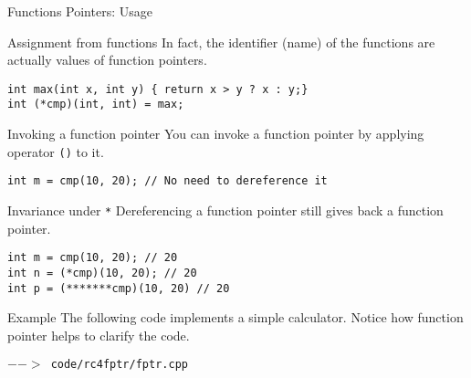 \begin{frame}[fragile]{Functions Pointers: Usage}
\begin{block}{Assignment from functions}
	In fact, the identifier (name) of the functions are actually values of function pointers. 
\begin{verbatim}
int max(int x, int y) { return x > y ? x : y;}
int (*cmp)(int, int) = max;
\end{verbatim}
\end{block}
\vspace{-0.1in}
\begin{block}{Invoking a function pointer}
	You can invoke a function pointer by applying operator \texttt{()} to it.
\begin{verbatim}
int m = cmp(10, 20); // No need to dereference it
\end{verbatim}
\end{block}
\vspace{-0.1in}
\begin{block}{Invariance under \texttt{*}}
	Dereferencing a function pointer still gives back a function pointer.
\begin{verbatim}
int m = cmp(10, 20); // 20
int n = (*cmp)(10, 20); // 20
int p = (*******cmp)(10, 20) // 20
\end{verbatim}
\end{block}
\end{frame}

\begin{frame}[fragile]{Example}
The following code implements a simple calculator. Notice how function pointer helps to clarify the code.

\texttt{$-->$ code/rc4fptr/fptr.cpp}
\inputminted{c++}{code/rc4fptr/fptr.cpp}
\end{frame}


